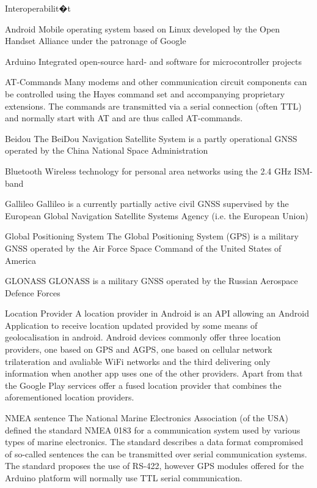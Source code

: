 \label{cha:glossar}
\begin{deflist}{Interoperabilit�t}
\item [Android] Mobile operating system based on Linux developed by the Open Handset Alliance under the patronage of Google
\item [Arduino] Integrated open-source hard- and software for microcontroller projects
\item [AT-Commands] Many modems and other communication circuit components can be controlled using the Hayes command set and accompanying proprietary extensions. The commands are transmitted via a serial connection (often TTL) and normally start with AT and are thus called AT-commands.
\item [Beidou] The BeiDou Navigation Satellite System is a partly operational GNSS operated by the China National Space Administration
\item [Bluetooth] Wireless technology for personal area networks using the 2.4 GHz ISM-band
\item [Gallileo] Gallileo is a currently partially active civil GNSS supervised by the European Global Navigation Satellite Systems Agency (i.e. the European Union)
\item [Global Positioning System ] The Global Positioning System (GPS) is a military GNSS operated by the Air Force Space Command of the United States of America
\item [GLONASS] GLONASS is a military GNSS operated by the Russian Aerospace Defence Forces
\item [Location Provider] A location provider in Android is an API allowing an Android Application to receive location updated provided by some means of geolocalisation in android. Android devices commonly offer three location providers, one based on GPS and AGPS, one based on cellular network trilateration and avaliable WiFi networks and the third delivering only information when another app uses one of the other providers. Apart from that the Google Play services offer a fused location provider that combines the aforementioned location providers.
\item [NMEA sentence]
The National Marine Electronics Association (of the USA) defined the standard NMEA 0183 for a communication system used by various types of marine electronics. The standard describes a data format compromised of so-called sentences the can be transmitted over serial communication systems. The standard proposes the use of RS-422, however GPS modules offered for the Arduino platform will normally use TTL serial communication.
\end{deflist}

